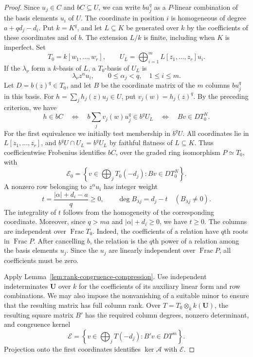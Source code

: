 \documentclass[12pt]{amsart}
\numberwithin{equation}{section}
\theoremstyle{definition}
\theoremstyle{remark}
\numberwithin{equation}{section}
\begin{document}
\begin{proof}
Since $u_j\in C$ and $bC\subseteq U$, we can write $bu_j^q$ as a $P$-linear combination of the basis elements $u_i$ of $U$.
The coordinate in position $i$ is homogeneous of degree $a+qd_j-d_i$. Put $k=K^q$, and let $L\subseteq K$ be generated over $k$ by
the coefficients of these coordinates and of $b$. The extension $L/k$ is finite, including when $K$ is imperfect. Set
\[
 T_0=k[w_1,\ldots,w_r],\qquad
 U_L=\bigoplus_{i=1}^mL[z_1,\ldots,z_r]u_i.
\]
If the $\lambda_\nu$ form a $k$-basis of $L$, a $T_0$-basis of $U_L$ is
\[
 \lambda_\nu z^\alpha u_i,
 \qquad 0\le\alpha_j<q,\quad 1\le i\le m.
\]
Let $D=b(z)^q\in T_0$, and let $B$ be the coordinate matrix of the $m$ columns $bu_j^q$ in this basis. For $h=\sum_jh_j(z)u_j\in U$, put $v_j(w)=h_j(z)^q$.
By the preceding criterion, we have
\[
 h\in bC
 \quad\Longleftrightarrow\quad
 b\sum_jv_j(w)u_j^q\in b^qU_L
 \quad\Longleftrightarrow\quad Bv\in DT_0^N.
\]
For the first equivalence we initially test membership in $b^qU$. All coordinates lie in $L[z_1,\ldots,z_r]$, and $b^qU\cap U_L=b^qU_L$ by faithful flatness of $L\subseteq K$. Thus coefficientwise Frobenius identifies $bC$, over the graded ring isomorphism $P\simeq T_0$, with
\[
 \mathcal E_0=\left\{v\in\bigoplus_jT_0(-d_j):
                         Bv\in DT_0^N\right\}.
\]
A nonzero row belonging to $z^\alpha u_i$ has integer weight
\[
 t=\frac{|\alpha|+d_i-a}{q}\ge0,
 \qquad \deg B_{\lambda j}=d_j-t
 \quad(B_{\lambda j}\ne0).
\]
The integrality of $t$ follows from the homogeneity of the corresponding coordinate. Moreover, since $q>ma$ and $|\alpha|+d_i\ge0$, we have $t\ge0$.
The columns are independent over $\operatorname{Frac}T_0$. Indeed, the coefficients of a relation have $q$th roots in $\operatorname{Frac}P$. After cancelling $b$, the relation is the $q$th power of a relation among the basis elements $u_j$. Since the $u_j$ are linearly independent over $\operatorname{Frac}P$, all coefficients must be zero.

Apply Lemma~\ref{lem:rank-congruence-compression}. Use independent indeterminates $\mathbf U$ over $k$ for the coefficients of its
auxiliary linear form and row combinations. We may also impose the nonvanishing of a suitable minor to ensure that the resulting matrix has full column rank.
Over $T=T_0\otimes_k k(\mathbf U)$, the resulting square matrix $B'$ has the required column degrees, nonzero determinant, and congruence kernel
\[
 \mathcal E=\left\{v\in\bigoplus_jT(-d_j):B'v\in DT^m\right\}.
\]
Projection onto the first coordinates identifies $\ker\mathcal A$ with $\mathcal E$.


\end{proof}
\end{document}
